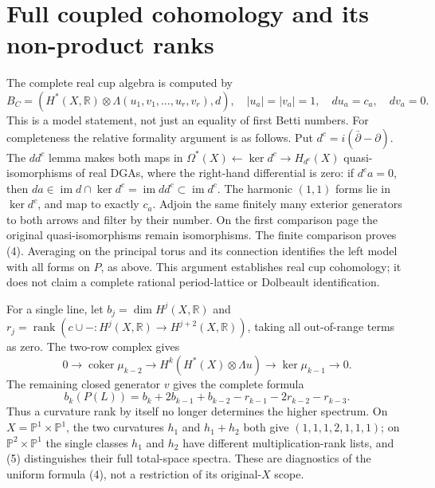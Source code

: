 \documentclass[11pt]{article}
\newcommand{\R}{\mathbb R}
\newcommand{\rk}{\operatorname{rank}}
\newcommand{\im}{\operatorname{im}}
\begin{document}
\section{Full coupled cohomology and its non-product ranks}
The complete real cup algebra is computed by
\[
 B_C=\left(H^*(X,\R)\otimes\Lambda(u_1,v_1,\ldots,u_r,v_r),d\right),
 \quad |u_a|=|v_a|=1,\quad du_a=c_a,\quad dv_a=0.                       \tag{4}
\]
This is a model statement, not just an equality of first Betti numbers.
For completeness the relative formality argument is as follows. Put
$d^c=i(\bar\partial-\partial)$. The $dd^c$ lemma makes both maps in
$\Omega^*(X)\leftarrow\ker d^c\to H_{d^c}(X)$ quasi-isomorphisms of real
DGAs, where the right-hand differential is zero: if $d^c a=0$, then
$da\in\im d\cap\ker d^c=\im dd^c\subset\im d^c$.
The harmonic $(1,1)$ forms lie in $\ker d^c$, and map to exactly $c_a$.
Adjoin the same finitely many exterior generators to both arrows and filter
by their number. On the first comparison page the original quasi-isomorphisms
remain isomorphisms. The finite comparison proves (4). Averaging on the
principal torus and its connection identifies the left model with all forms
on $P$, as above. This argument establishes real cup cohomology; it does not
claim a complete rational period-lattice or Dolbeault identification.

For a single line, let $b_j=\dim H^j(X,\R)$ and
$r_j=\rk(c\cup-:H^j(X,\R)\to H^{j+2}(X,\R))$, taking all out-of-range
terms as zero. The two-row complex gives
\[
0\to\operatorname{coker}\mu_{k-2}\to
H^k(H^*(X)\otimes\Lambda u)\to\ker\mu_{k-1}\to0.
\]
The remaining closed generator $v$ gives the complete formula
\[
 b_k(P(L))=b_k+2b_{k-1}+b_{k-2}-r_{k-1}-2r_{k-2}-r_{k-3}.             \tag{5}
\]
Thus a curvature rank by itself no longer determines the higher spectrum.
On $X=\mathbb P^1\times\mathbb P^1$, the two curvatures $h_1$ and
$h_1+h_2$ both give $(1,1,1,2,1,1,1)$; on $\mathbb P^2\times\mathbb P^1$
the single classes $h_1$ and $h_2$ have different multiplication-rank lists,
and (5) distinguishes their full total-space spectra. These are diagnostics
of the uniform formula (4), not a restriction of its original-$X$ scope.
\end{document}
